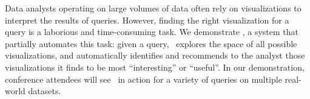 

% 
Data analysts operating on large volumes of data 
often rely on visualizations to interpret the results of queries. 
However, finding the right visualization for a query is 
a laborious and time-consuming task. 
We demonstrate \SeeDB, a system that partially automates 
this task: 
given a query, \SeeDB\ explores the space of all possible visualizations,
and automatically identifies and recommends to the analyst those visualizations
it finds to be most ``interesting'' or ``useful''.
In our demonstration, conference attendees
will see \SeeDB\ in action for a variety of queries on multiple real-world
datasets.




